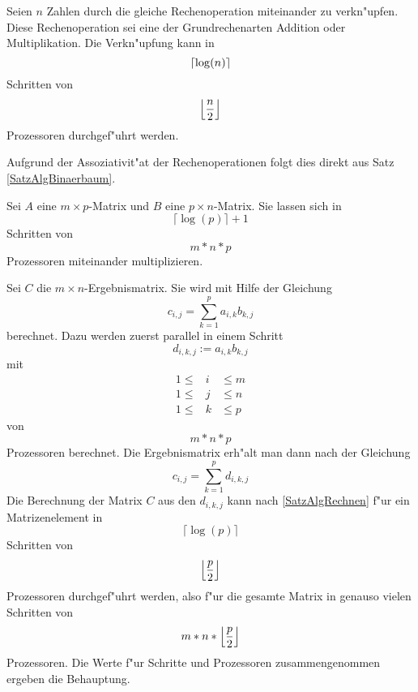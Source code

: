 \begin{korollar}
\label{SatzAlgRechnen}             %
    Seien $n$ Zahlen durch die gleiche Rechenoperation miteinander zu
    verkn"upfen. Diese Rechenoperation sei eine der Grundrechenarten
    Addition oder Multiplikation. Die Verkn"upfung kann in
    \[ \left\lceil \log(n) \right\rceil \] Schritten von
    \[ \left\lfloor \frac{n}{2} \right\rfloor \] Prozessoren durchgef"uhrt
    werden.
\end{korollar}
\begin{beweis}
    Aufgrund der Assoziativit"at der Rechenoperationen folgt
    dies direkt aus Satz \ref{SatzAlgBinaerbaum}. 
    \mbox{ \hspace{4em} \hfill }
\end{beweis}

\begin{satz}
\label{SatzAlgMatMult}            %
    Sei $A$ eine $m \times p$-Matrix und $B$ eine $p \times n$-Matrix.
    Sie lassen sich in
    \[ \lceil \log(p) \rceil + 1 \] Schritten von
    \[ m * n * p \] Prozessoren miteinander
    multiplizieren.
\end{satz}
\begin{beweis}
    Sei $C$ die $m \times n$-Ergebnismatrix. 
    Sie wird mit Hilfe der Gleichung
    \[ c_{i,j} = \sum_{k=1}^p a_{i,k} b_{k,j} \]
    berechnet. Dazu werden zuerst parallel in einem Schritt
    \[ d_{i,k,j} := a_{i,k} b_{k,j} \] mit
    \begin{eqnarray*}
         1 \leq & i & \leq m \\
         1 \leq & j & \leq n \\
         1 \leq & k & \leq p 
    \end{eqnarray*} von
    \[ m * n * p \] Prozessoren berechnet.
    Die Ergebnismatrix erh"alt man dann nach der Gleichung
    \[ c_{i,j} = \sum_{k=1}^p d_{i,k,j} \]
    Die Berechnung der Matrix $C$ aus den $d_{i,k,j}$ kann nach
    \ref{SatzAlgRechnen} f"ur ein Matrizenelement in
    \[ \lceil \log(p) \rceil \] Schritten von
    \[ \left\lfloor \frac{p}{2} \right\rfloor \] Prozessoren durchgef"uhrt
    werden, also f"ur
    die gesamte Matrix in genauso vielen Schritten von
    \[ m * n * \left\lfloor \frac{p}{2} \right\rfloor \] Prozessoren.
    Die Werte
    f"ur Schritte und Prozessoren zusammengenommen ergeben die Behauptung.
\end{beweis}

